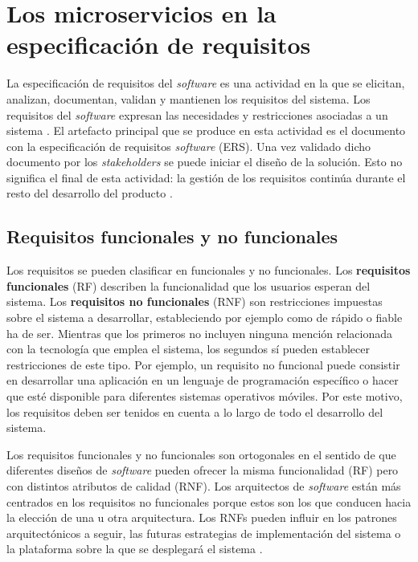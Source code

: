 \documentclass[11pt,spanish,listoffigures]{tfgetsinf}
\begin{document}
\section{Los microservicios en la especificación de requisitos}

La especificación de requisitos del \textit{software} es una actividad en la que se elicitan, analizan, documentan, validan y mantienen los requisitos del sistema. Los requisitos del \textit{software} expresan las necesidades y restricciones asociadas a un sistema \cite{Fernandes2016}. El artefacto principal que se produce en esta actividad es el documento con la especificación de requisitos \textit{software} (ERS). Una vez validado dicho documento por los \textit{stakeholders} se puede iniciar el diseño de la solución. Esto no significa el final de esta actividad: la gestión de los requisitos continúa durante el resto del desarrollo del producto \cite{Bourque2014}.

\subsection{Requisitos funcionales y no funcionales} \label{subsect:RNF}

Los requisitos se pueden clasificar en funcionales y no funcionales. Los \textbf{requisitos funcionales} (RF) describen la funcionalidad que los usuarios esperan del sistema. Los \textbf{requisitos no funcionales} (RNF) son restricciones impuestas sobre el sistema a desarrollar, estableciendo por ejemplo como de rápido o fiable ha de ser. Mientras que los primeros no incluyen ninguna mención relacionada con la tecnología que emplea el sistema, los segundos sí pueden establecer restricciones de este tipo. Por ejemplo, un requisito no funcional puede consistir en desarrollar una aplicación en un lenguaje de programación específico o hacer que esté disponible para diferentes sistemas operativos móviles. Por este motivo, los requisitos deben ser tenidos en cuenta a lo largo de todo el desarrollo del sistema.

Los requisitos funcionales y no funcionales son ortogonales en el sentido de que diferentes diseños de \textit{software} pueden ofrecer la misma funcionalidad (RF) pero con distintos atributos de calidad (RNF). Los arquitectos de \textit{software} están más centrados en los requisitos no funcionales porque estos son los que conducen hacia la elección de una u otra arquitectura. Los RNFs pueden influir en los patrones arquitectónicos a seguir, las futuras estrategias de implementación del sistema o la plataforma sobre la que se desplegará el sistema \cite{Ameller2013}.
\end{document}
